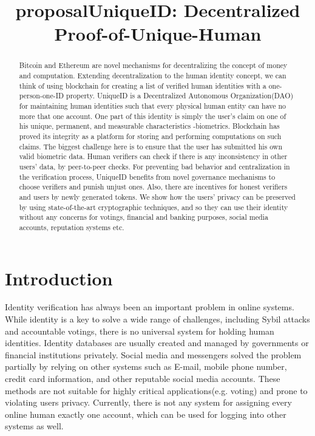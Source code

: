\documentclass[conference]{IEEEtran}
\title{proposal}
\begin{document}
\title{UniqueID: Decentralized Proof-of-Unique-Human}
\author{
    \and
    }
    \maketitle
    
\begin{abstract}
    Bitcoin and Ethereum are novel mechanisms for decentralizing the concept of money and computation. Extending decentralization to the human identity concept, we can think of using blockchain for creating a list of verified human identities with a one-person-one-ID property. UniqueID is a Decentralized Autonomous Organization(DAO) for maintaining human identities such that every physical human entity can have no more that one account. One part of this identity is simply the user's claim on one of his unique, permanent, and measurable characteristics -biometrics. Blockchain has proved its integrity as a platform for storing and performing computations on such claims. The biggest challenge here is to ensure that the user has submitted his own valid biometric data. Human verifiers can check if there is any inconsistency in other users' data, by peer-to-peer checks. For preventing bad behavior and centralization in the verification process, UniqueID benefits from novel governance mechanisms to choose verifiers and punish unjust ones. Also, there are incentives for honest verifiers and users by newly generated tokens. We show how the users' privacy can be preserved by using state-of-the-art cryptographic techniques, and so they can use their identity without any concerns for votings, financial and banking purposes, social media accounts, reputation systems etc.
    
\end{abstract}
\section{Introduction}
Identity verification has always been an important problem in online systems. While identity is a key to solve a wide range of challenges, including Sybil attacks \cite{Sybil} and accountable votings, there is no universal system for holding human identities. Identity databases are usually created and managed by governments or financial institutions privately. Social media and messengers solved the problem partially by relying on other systems such as E-mail, mobile phone number, credit card information, and other reputable social media accounts. These methods are not suitable for highly critical applications(e.g. voting) and prone to violating users privacy. Currently, there is not any system for assigning every online human exactly one account, which can be used for logging into other systems as well.
\end{document}

